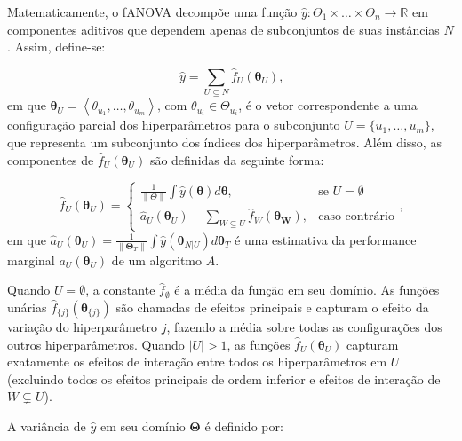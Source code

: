 \documentclass[
  12pt,
  a4paper,
]{scrreprt}
\begin{document}
\vspace{12pt}

Matematicamente, o fANOVA decompõe uma função
\(\hat y: \Theta_{1} \times \dots \times \Theta_{n} \rightarrow \mathbb{R}\)
em componentes aditivos que dependem apenas de subconjuntos de suas
instâncias \(N\). Assim, define-se:

\[
\hat{y} = \sum_{U \subseteq N} \hat{f}_{U} \left(\boldsymbol{\theta}_{U}\right)\text{,}
\] em que
\(\boldsymbol{\theta}_U = \left<\theta_{u_{1}}, \dots, \theta_{u_{m}}\right> \text{, com } \theta_{u_i} \in \Theta_{u_i}\),
é o vetor correspondente a uma configuração parcial dos hiperparâmetros
para o subconjunto \(U = \{u_{1}, \dots, u_{m}\}\), que representa um
subconjunto dos índices dos hiperparâmetros. Além disso, as componentes
de \(\hat{f}_{U} \left(\boldsymbol{\theta}_{U}\right)\) são definidas da
seguinte forma:

\[
\hat{f}_{U} \left(\boldsymbol{\theta}_{U}\right)=
\begin{cases}
  \frac{1}{\|\Theta\|} \int \hat{y} \left(\boldsymbol{\theta}\right) d\boldsymbol{\theta}, & \text{se } U= \emptyset \\
  \hat{a}_{U}\left(\boldsymbol{\theta}_U\right) - \sum_{W \subseteq U} \hat{f}_{W}\left(\boldsymbol{\theta_{W}}\right), & \text{caso contrário}
\end{cases}\text{,}
\] em que
\(\hat{a}_{U}\left(\boldsymbol{\theta}_U\right) = \frac{1}{\|\boldsymbol{\Theta}_{T}\|} \int \hat{y}\left(\boldsymbol{\theta}_{N|U}\right)d \boldsymbol{\theta}_{T}\)
é uma estimativa da performance marginal
\(a_U\left(\boldsymbol{\theta}_U\right)\) de um algoritmo \(A\).

\vspace{12pt}

Quando \(U = \emptyset\), a constante \(\hat{f}_{\emptyset}\) é a média
da função em seu domínio. As funções unárias
\(\hat{f}_{\{j\}}\left(\boldsymbol{\theta}_{\{j\}}\right)\) são chamadas
de efeitos principais e capturam o efeito da variação do hiperparâmetro
\(j\), fazendo a média sobre todas as configurações dos outros
hiperparâmetros. Quando \(|U| > 1\), as funções
\(\hat{f}_{U}\left(\boldsymbol{\theta}_U\right)\) capturam exatamente os
efeitos de interação entre todos os hiperparâmetros em \(U\) (excluindo
todos os efeitos principais de ordem inferior e efeitos de interação de
\(W \subsetneq U\)).

\vspace{12pt}

A variância de \(\hat{y}\) em seu domínio \(\boldsymbol{\Theta}\) é
definido por:
\end{document}

